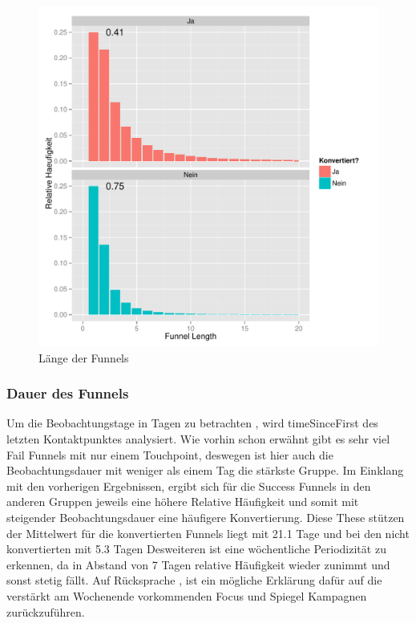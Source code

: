 \begin{figure}[H]
    \centering
    \includegraphics[scale=0.5]{funnelLength_First.pdf}
    \caption{Länge der Funnels}
    \label{Fig_7}
\end{figure}






\subsubsection*{Dauer des Funnels}
Um die Beobachtungstage in Tagen zu betrachten , wird timeSinceFirst des letzten Kontaktpunktes analysiert. Wie vorhin schon erwähnt gibt es sehr viel Fail Funnels mit nur einem Touchpoint, deswegen ist hier auch die Beobachtungsdauer mit weniger als einem Tag die stärkste Gruppe. Im Einklang mit den vorherigen Ergebnissen, ergibt sich für die Success Funnels in den anderen Gruppen jeweils eine höhere Relative Häufigkeit und somit mit steigender Beobachtungsdauer eine häufigere Konvertierung.
Diese These stützen der Mittelwert für die konvertierten Funnels liegt mit 21.1 Tage und bei den nicht konvertierten mit 5.3 Tagen
Desweiteren ist eine wöchentliche Periodizität zu erkennen, da in Abstand von 7 Tagen relative Häufigkeit wieder zunimmt und sonst stetig fällt.  Auf Rücksprache , ist ein mögliche Erklärung dafür auf die verstärkt am Wochenende vorkommenden Focus und Spiegel Kampagnen zurückzuführen.


